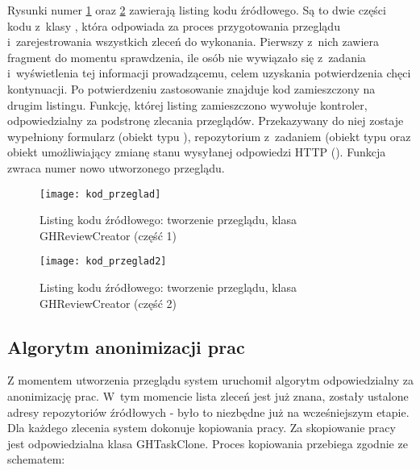 \clearpage
Rysunki numer \ref{kodp1} oraz \ref{kodp2} zawierają listing kodu źródłowego. Są to dwie części kodu z~klasy , która odpowiada za proces przygotowania przeglądu i~zarejestrowania wszystkich zleceń do wykonania. Pierwszy z~nich zawiera fragment do momentu sprawdzenia, ile osób nie wywiązało się z~zadania i~wyświetlenia tej informacji prowadzącemu, celem uzyskania potwierdzenia chęci kontynuacji. Po potwierdzeniu zastosowanie znajduje kod zamieszczony na drugim listingu. Funkcję, której listing zamieszczono wywołuje kontroler, odpowiedzialny za podstronę zlecania przeglądów. Przekazywany do niej zostaje wypełniony formularz (obiekt typu ), repozytorium z~zadaniem (obiekt typu  oraz obiekt umożliwiający zmianę stanu wysyłanej odpowiedzi HTTP (). Funkcja zwraca numer nowo utworzonego przeglądu.

\begin{figure}[!h]
    \texttt{[image: kod\_przeglad]}
    \caption{Listing kodu źródłowego: tworzenie przeglądu, klasa GHReviewCreator (część 1)}
    \label{kodp1}
\end{figure}

\begin{figure}[!h]
    \texttt{[image: kod\_przeglad2]}
    \caption{Listing kodu źródłowego: tworzenie przeglądu, klasa GHReviewCreator (część 2)}
    \label{kodp2}
\end{figure}

\clearpage
\subsection{Algorytm anonimizacji prac}
Z momentem utworzenia przeglądu system uruchomił algorytm odpowiedzialny za anonimizację prac. W~tym momencie lista zleceń jest już znana, zostały ustalone adresy repozytoriów źródłowych - było to niezbędne już na wcześniejszym etapie. Dla każdego zlecenia system dokonuje kopiowania pracy. Za skopiowanie pracy jest odpowiedzialna klasa GHTaskClone. Proces kopiowania przebiega zgodnie ze schematem:

